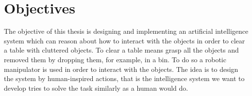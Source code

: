 
 








\section{Objectives}
The objective of this thesis is designing and implementing an artificial intelligence system which can reason about how to interact with the objects in order to clear a table with cluttered objects. To clear a table means grasp all the objects and removed them by dropping them, for example, in a bin. To do so a robotic manipulator is used in order to interact with the objects. The idea is to design the system by human-inspired actions, that is the intelligence system we want to develop tries to solve the task similarly as a human would do.


